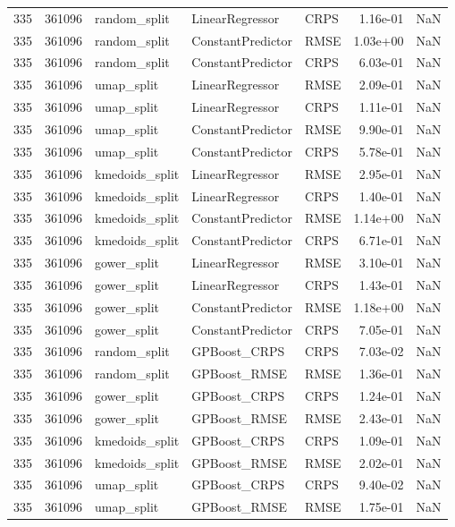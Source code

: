 \begin{tabular}{rrlllrr}
335 & 361096 & random\_split & LinearRegressor & CRPS & 1.16e-01 & NaN \\
335 & 361096 & random\_split & ConstantPredictor & RMSE & 1.03e+00 & NaN \\
335 & 361096 & random\_split & ConstantPredictor & CRPS & 6.03e-01 & NaN \\
335 & 361096 & umap\_split & LinearRegressor & RMSE & 2.09e-01 & NaN \\
335 & 361096 & umap\_split & LinearRegressor & CRPS & 1.11e-01 & NaN \\
335 & 361096 & umap\_split & ConstantPredictor & RMSE & 9.90e-01 & NaN \\
335 & 361096 & umap\_split & ConstantPredictor & CRPS & 5.78e-01 & NaN \\
335 & 361096 & kmedoids\_split & LinearRegressor & RMSE & 2.95e-01 & NaN \\
335 & 361096 & kmedoids\_split & LinearRegressor & CRPS & 1.40e-01 & NaN \\
335 & 361096 & kmedoids\_split & ConstantPredictor & RMSE & 1.14e+00 & NaN \\
335 & 361096 & kmedoids\_split & ConstantPredictor & CRPS & 6.71e-01 & NaN \\
335 & 361096 & gower\_split & LinearRegressor & RMSE & 3.10e-01 & NaN \\
335 & 361096 & gower\_split & LinearRegressor & CRPS & 1.43e-01 & NaN \\
335 & 361096 & gower\_split & ConstantPredictor & RMSE & 1.18e+00 & NaN \\
335 & 361096 & gower\_split & ConstantPredictor & CRPS & 7.05e-01 & NaN \\
335 & 361096 & random\_split & GPBoost\_CRPS & CRPS & 7.03e-02 & NaN \\
335 & 361096 & random\_split & GPBoost\_RMSE & RMSE & 1.36e-01 & NaN \\
335 & 361096 & gower\_split & GPBoost\_CRPS & CRPS & 1.24e-01 & NaN \\
335 & 361096 & gower\_split & GPBoost\_RMSE & RMSE & 2.43e-01 & NaN \\
335 & 361096 & kmedoids\_split & GPBoost\_CRPS & CRPS & 1.09e-01 & NaN \\
335 & 361096 & kmedoids\_split & GPBoost\_RMSE & RMSE & 2.02e-01 & NaN \\
335 & 361096 & umap\_split & GPBoost\_CRPS & CRPS & 9.40e-02 & NaN \\
335 & 361096 & umap\_split & GPBoost\_RMSE & RMSE & 1.75e-01 & NaN \\

\end{tabular}
